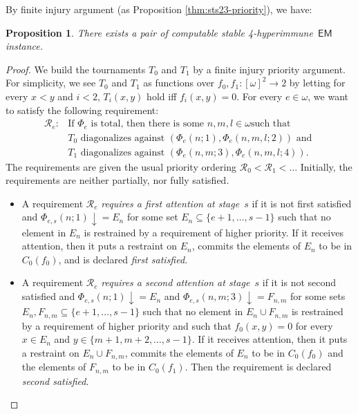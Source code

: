 \documentclass{amsart}
\newtheorem{proposition}[theorem]{Proposition}
\theoremstyle{definition}
\theoremstyle{remark}
\numberwithin{equation}{section}
\theoremstyle{noparens}
\def\msf{\mathsf}
\newcommand{\Rcal}{\mathcal{R}}
\def\iatfshyp{4-hyperimmune}
\begin{document}
By finite injury argument (as
Proposition \ref{thm:sts23-priority}), we have:
\begin{proposition}\label{uemprop1}
There exists a pair of computable stable \iatfshyp\ $\msf{EM}$
instance.
\end{proposition}
\begin{proof}
We build the tournaments $T_0$ and $T_1$ by a finite injury priority argument. For simplicity, we see $T_0$ and $T_1$ as functions over $f_0, f_1 : [\omega]^2 \to 2$ by letting for every $x < y$ and $i < 2$, $T_i(x, y)$ hold iff $f_i(x, y) = 0$.
For every $e \in \omega$, we want to satisfy the following requirement:
\begin{align}
\Rcal_e: &\text{If $\Phi_e$ is total, then there is some $n, m, l \in \omega$
such that}\\ \nonumber
&\text{$T_0$ diagonalizes against $(\Phi_e(n;1), \Phi_e(n, m, l;2))$ and }\\ \nonumber
& \text{$T_1$ diagonalizes against $(\Phi_e(n,m;3), \Phi_e(n, m, l;4))$.}
\end{align}
The requirements are given the usual priority ordering $\Rcal_0 < \Rcal_1 < \dots$
Initially, the requirements are neither partially, nor fully satisfied.
\begin{itemize}
	\item[(i)] A requirement $\Rcal_e$ \emph{requires a first attention at stage~$s$}
	if it is not first satisfied and $\Phi_{e,s}(n;1) \downarrow = E_n$ for some set $E_n \subseteq \{e+1, \dots, s-1\}$
	such that no element in $E_n$ is restrained by a requirement of higher priority.
	If it receives attention, then it puts a restraint on $E_n$,
	commits the elements of $E_n$ to be in $C_0(f_0)$, and is declared \emph{first satisfied}.
	
	\item[(ii)] A requirement $\Rcal_e$ \emph{requires a second attention at stage~$s$}
	if it is not second satisfied and $\Phi_{e,s}(n;1) \downarrow = E_n$ and $\Phi_{e,s}(n,m;3) \downarrow = F_{n,m}$ for some sets $E_n, F_{n,m} \subseteq \{e+1, \dots, s-1\}$
	such that no element in $E_n \cup F_{n,m}$ is restrained by a requirement of higher priority
	and such that $f_0(x, y) = 0$ for every $x \in E_n$ and $y \in \{m+1, m+2, \dots, s-1\}$.
	If it receives attention, then it puts a restraint on $E_n \cup F_{n,m}$,
	commits the elements of $E_n$ to be in $C_0(f_0)$ and the elements of $F_{n,m}$ to be in $C_0(f_1)$. Then the requirement is declared \emph{second satisfied}.


\end{itemize}
\end{proof}
\end{document}
